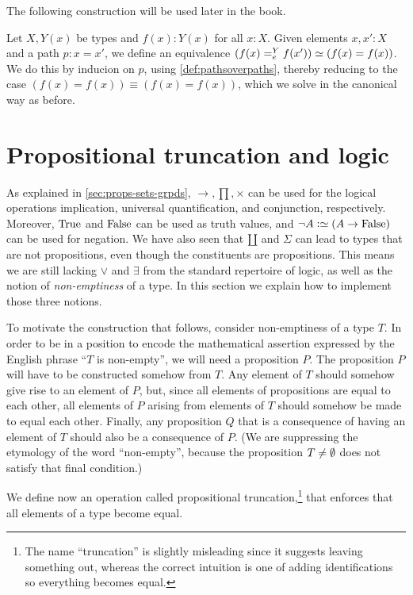 The following construction will be used later in the book.

\begin{definition}\label{def:Dan's-lemma}
Let $X,Y(x)$ be types and $f(x): Y(x)$ for all $x:X$.
Given elements $x,x':X$ and a path $p : x = x'$, we define an equivalence
$(f(x) =^{Y}_{e} f(x')) \simeq (f(x)=f(x))$.
We do this by inducion on $p$, using \cref{def:pathsoverpaths},
thereby reducing to the case $(f(x)=f(x)) \equiv (f(x)=f(x))$, 
which we solve in the canonical way as before.
\end{definition}


\section{Propositional truncation and logic}
\label{sec:prop-trunc}

As explained in \cref{sec:props-sets-grpds}, $\to,\prod,\times$ 
can be used for the logical operations implication, 
universal quantification, and conjunction, respectively.
Moreover, $\mathrm{True}$ and $\mathrm{False}$ can be used as truth values,
and $\neg A \defeq (A\to\false)$ can be used for negation.
We have also seen that ${\amalg}$ and $\Sigma$ can lead to types
that are not propositions, even though the constituents are
propositions. This means we are still lacking $\vee$ and $\exists$
from the standard repertoire of logic, as well as the notion of {\em non-emptiness} of a type.
In this section we explain how to implement those three notions.

To motivate the construction that follows, consider non-emptiness of a type $T$.  In order to be in a position to encode the mathematical
assertion expressed by the English phrase ``$T$ is non-empty'', we will need a proposition $P$.  The proposition $P$ will have to be constructed
somehow from $T$.  Any element of $T$ should somehow give rise to an element of $P$, but, since all elements of propositions are equal to each
other, all elements of $P$ arising from elements of $T$ should somehow be made to equal each other.  Finally, any proposition $Q$ that is a
consequence of having an element of $T$ should also be a consequence of $P$.  (We are suppressing the etymology of the word ``non-empty'',
because the proposition $T \ne \emptyset$ does not satisfy that final condition.)

We define now an operation called propositional truncation,\footnote{%
The name ``truncation'' is slightly misleading since it suggests leaving
something out, whereas the correct intuition is one of adding identifications
so everything becomes equal.}
that enforces that all elements of a type become equal.

